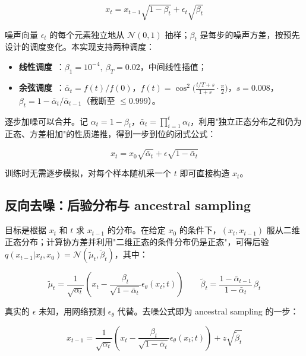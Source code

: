 \documentclass[11pt]{article}
\begin{document}
\begin{equation}
    \boxed{x_{t} = x_{t-1}\sqrt{1-\beta_t} + \epsilon_t \sqrt{\beta_t}}
\end{equation}

噪声向量 $\epsilon_t$ 的每个元素独立地从 $\mathcal{N}(0,1)$ 抽样；$\beta_t$ 是每步的噪声方差，按预先设计的调度变化。本实现支持两种调度：

\begin{itemize}
    \item \textbf{线性调度}~\parencite{ho2020denoising}：$\beta_1=10^{-4},\ \beta_T=0.02$，中间线性插值；
    \item \textbf{余弦调度}~\parencite{nichol2021improved}：$\bar{\alpha}_t = f(t)/f(0)$，$f(t)=\cos^2\!\big(\frac{t/T+s}{1+s}\cdot\frac{\pi}{2}\big)$，$s=0.008$，$\beta_t = 1-\bar{\alpha}_t/\bar{\alpha}_{t-1}$（截断至 $\leq 0.999$）。
\end{itemize}

逐步加噪可以合并。记 $\alpha_t = 1-\beta_t$，$\bar{\alpha}_t = \prod_{i=1}^t \alpha_i$，利用"独立正态分布之和仍为正态、方差相加"的性质递推，得到一步到位的闭式公式：

\begin{equation}
    \boxed{x_t = x_0\sqrt{\bar{\alpha}_t} + \epsilon \sqrt{1-\bar{\alpha}_t}}
\end{equation}

训练时无需逐步模拟，对每个样本随机采一个 $t$ 即可直接构造 $x_t$。

\subsection{反向去噪：后验分布与 ancestral sampling}

目标是根据 $x_t$ 和 $t$ 求 $x_{t-1}$ 的分布。在给定 $x_0$ 的条件下，$(x_t, x_{t-1})$ 服从二维正态分布；计算协方差并利用"二维正态的条件分布仍是正态"，可得后验 $q(x_{t-1}|x_t,x_0) = \mathcal{N}(\tilde{\mu}_t, \tilde{\beta}_t)$，其中：

\begin{equation}
    \boxed{\tilde{\mu}_t = \frac{1}{\sqrt{\alpha_t}} \left(x_t - \frac{\beta_t}{\sqrt{1-\bar{\alpha}_t}}\epsilon_{\theta}(x_t;t)\right)}
    \qquad
    \boxed{\tilde{\beta}_t = \frac{1-\bar{\alpha}_{t-1}}{1-\bar{\alpha}_t}\,\beta_t}
\end{equation}

真实的 $\epsilon$ 未知，用网络预测 $\epsilon_\theta$ 代替。去噪公式即为 ancestral sampling 的一步：

\begin{equation}
    \boxed{x_{t-1} = \frac{1}{\sqrt{\alpha_t}} \left(x_t - \frac{\beta_t}{\sqrt{1-\bar{\alpha}_t}}\epsilon_{\theta}(x_t;t)\right) + z\sqrt{\tilde{\beta}_t}}
\end{equation}
\end{document}

